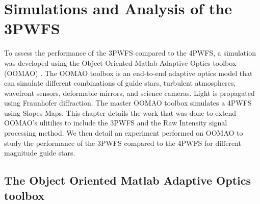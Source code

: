 \chapter{Simulations and Analysis of the 3PWFS}

To assess the performance of the 3PWFS compared to the 4PWFS, a simulation was developed using the Object Oriented Matlab Adaptive Optics toolbox (OOMAO) \cite{OOMAO}. The OOMAO toolbox is an end-to-end adaptive optics model that can simulate different combinations of guide stars, turbulent atmospheres, wavefront sensors, deformable mirrors, and science cameras. Light is propagated using Fraunhofer diffraction. The master OOMAO toolbox simulates a 4PWFS using Slopes Maps. This chapter details the work that was done to extend OOMAO's ulitilies to include the 3PWFS and the Raw Intensity signal processing method. We then detail an experiment performed on OOMAO to study the performance of the 3PWFS compared to the 4PWFS for different magnitude guide stars. 

\section{The Object Oriented Matlab Adaptive Optics toolbox}

